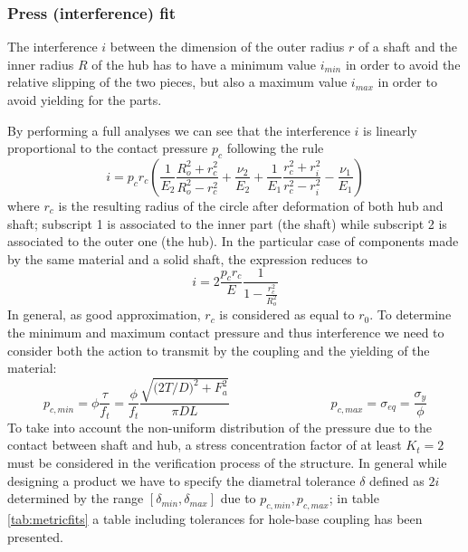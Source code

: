 	\subsubsection{Press (interference) fit} The interference $i$ between the dimension of the outer radius $r$ of a shaft and the inner radius $R$ of the hub has to have a minimum value $i_{min}$ in order to avoid the relative slipping of the two pieces, but also a maximum value $i_{max}$ in order to avoid yielding for the parts. 
	
	By  performing a full analyses we can see that the interference $i$ is linearly proportional to the contact pressure $p_c$ following the rule
	\begin{equation}
		i = p_c r_c \left( \frac 1 {E_2} \frac{R_o^2+r_c^2}{R_o^2-r_c^2} + \frac{\nu_2}{E_2} + \frac{1}{E_1}  \frac{r_c^2 + r_i^2}{r_c^2 - r_i^2} - \frac{\nu_1}{E_1}\right)
	\end{equation}
	where $r_c$ is the resulting radius of the circle after deformation of both hub and shaft; subscript 1 is associated to the inner part (the shaft) while subscript 2 is associated to the outer one (the hub). In the particular case of components made by the same material and a solid shaft, the expression reduces to
	\begin{equation} \label{eq:interferencesimple}
		i = 2 \frac{p_c r_c}{E} \frac 1 {1-\frac{r_c^2}{R_o^2}}
	\end{equation}
	In general, as good approximation, $r_c$ is considered as equal to $r_0$. To determine the minimum and maximum contact pressure and thus interference we need to consider both the action to transmit by the coupling and the yielding of the material:
	\begin{equation}
		p_{c,min} = \phi \frac \tau {f_t} = \frac{\phi}{f_t} \frac{\sqrt{\big(2 T/D\big)^2 + F_a^2}}{\pi DL} \qquad \qquad \qquad \qquad
		p_{c,max}  = \sigma_{eq} = \frac{\sigma_y}{\phi}
	\end{equation}
	To take into account the non-uniform distribution of the pressure due to the contact between shaft and hub, a stress concentration factor of at least $K_t = 2$ must be considered in the verification process of the structure. In general while designing a product we have to specify the diametral tolerance $\delta$ defined as $2i$ determined by the range $[\delta_{min},\delta_{max}]$ due to $p_{c,min}, p_{c,max}$; in table \ref{tab:metricfits} a table including tolerances for hole-base coupling has been presented.
	
	
	
